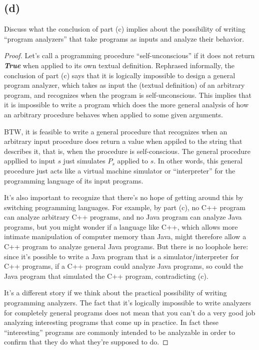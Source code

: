 \documentclass[14pt]{extarticle}
\newcommand{\str}[1]{\textit{\textbf{#1}}}
\begin{document}
\subsection{(d)}
Discuss what the conclusion of part (c) implies about the possibility of writing ``program analyzers'' that take programs as inputs and analyze their behavior.
\begin{proof}
Let's call a programming procedure ``self-unconscious'' if it does not return \str{True} when applied to its own textual definition.
Rephrased informally, the conclusion of part (c) says that it is logically impossible to design a general program analyzer, which takes as input the (textual definition) of an arbitrary program,
and recognizes when the program is self-unconscious. This implies that it is impossible to write a program which does the more general analysis of how an arbitrary procedure behaves when applied to some given arguments.

BTW, it is feasible to write a general procedure that recognizes when an arbitrary input procedure does return a value when appiled to the string that describes it, that is, when the procedure is
self-conscious. The general procedure appllied to input $s$ just simulates $P_s$ applied to $s$. In other words, this general procedure just acts like a virtual machine simulator or ``interpreter'' for the programming language of its input programs.

It's also important to recognize that there's no hope of getting around this by switching program­ming languages. For example, by part (c), no C++ program can analyze arbitrary C++ programs, and no Java program can analyze Java programs, but you might wonder if a language like C++, which allows more intimate manipulation of computer memory than Java, might therefore allow a C++ program to analyze general Java programs. But there is no loophole here: since it’s possible to write a Java program that is a simulator/interpreter for C++ programs, if a C++ program could analyze Java programs, so could the Java program that simulated the C++ program, contradict­ing (c).

It's a different story if we think about the practical possibility of writing programming analyzers. The fact that it's logically impossible to write analyzers for completely general programs does not mean that you can't do a very good job analyzing interesting programs that come up in practice. In fact these ``interesting'' programs are commonly intended to be analyzable in order to confirm
that they do what they're supposed to do. 


\end{proof}
\end{document}
